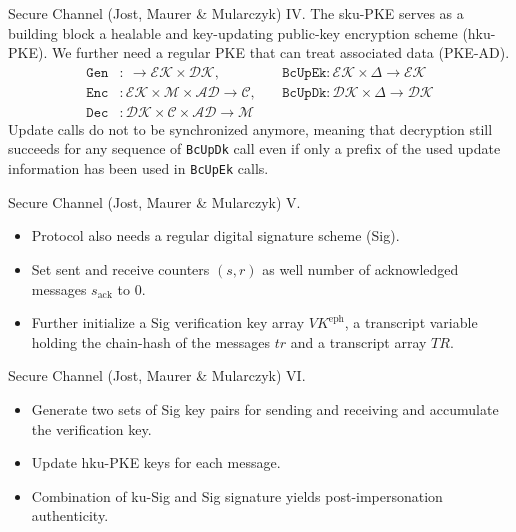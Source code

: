 \documentclass{beamer}
\renewcommand{\t}{\text}
\begin{document}
\begin{frame}{Secure Channel (Jost, Maurer \& Mularczyk) IV.}
  The sku-PKE serves as a building block a healable and key-updating
  public-key encryption scheme (hku-PKE). We further need a regular
  PKE that can treat associated data (PKE-AD).
  \begin{align*}
    \texttt{Gen} & : \ \rightarrow \mathcal{EK} \times \mathcal{DK}, \ &&
    \texttt{BcUpEk} : \mathcal{EK} \times \Delta \rightarrow \mathcal{EK} \\
    \texttt{Enc} & : \mathcal{EK} \times \mathcal{M} \times \mathcal{AD}
                   \rightarrow \mathcal{C}, \ &&
    \texttt{BcUpDk} : \mathcal{DK} \times \Delta \rightarrow \mathcal{DK} \\
    \texttt{Dec} & : \mathcal{DK} \times \mathcal{C} \times \mathcal{AD}
                   \rightarrow \mathcal{M}
  \end{align*}
  Update calls do not to be synchronized anymore, meaning that decryption still
  succeeds for any sequence of \texttt{BcUpDk} call even if only a prefix
  of the used update information has been used in \texttt{BcUpEk} calls.
\end{frame}

\begin{frame}{Secure Channel (Jost, Maurer \& Mularczyk) V.}
  \scriptsize
  \begin{figure}[ht]
     \centering
     \setlength{\fboxsep}{10pt}
     \scalebox{0.6}{%
       \fbox{%
         
       }
     }
  \end{figure}
  \begin{itemize}
  \item Protocol also needs a regular digital signature scheme (Sig).
  \item Set sent and receive counters $(s,r)$ as well number of acknowledged
    messages $s_\t{ack}$ to 0.
  \item Further initialize a Sig verification key array $VK^\t{eph}$, a transcript
    variable holding the chain-hash of the messages $tr$ and a transcript array $TR$.
  \end{itemize}
\end{frame}

\begin{frame}{Secure Channel (Jost, Maurer \& Mularczyk) VI.}
  \scriptsize
  \begin{figure}[ht]
     \centering
     \setlength{\fboxsep}{10pt}
     \scalebox{0.6}{%
       \fbox{%
         
       }
     }
  \end{figure}
  \begin{itemize}
  \item Generate two sets of Sig key pairs for sending and receiving and
    accumulate the verification key.
  \item Update hku-PKE keys for each message.
  \item Combination of ku-Sig and Sig signature yields post-impersonation
    authenticity.
  \end{itemize}
\end{frame}
\end{document}
